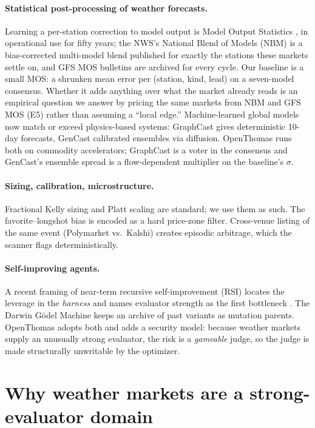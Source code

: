 \documentclass[sigconf,review,anonymous]{acmart}
\begin{document}
\paragraph{Statistical post-processing of weather forecasts.} Learning a
per-station correction to model output is Model Output Statistics
\cite{mos1972}, in operational use for fifty years; the NWS's National Blend
of Models (NBM) \cite{nbm} is a bias-corrected multi-model blend published for
exactly the stations these markets settle on, and GFS MOS bulletins are archived
for every cycle. Our baseline is a small MOS: a shrunken mean error per
(station, kind, lead) on a seven-model consensus. Whether it adds anything over
what the market already reads is an empirical question we answer by pricing the
same markets from NBM and GFS MOS (E5) rather than assuming a ``local edge.''
Machine-learned global models now match or exceed physics-based systems:
GraphCast \cite{graphcast} gives deterministic 10-day forecasts, GenCast
\cite{gencast} calibrated ensembles via diffusion. OpenThomas runs both on
commodity accelerators; GraphCast is a voter in the consensus and GenCast's
ensemble spread is a flow-dependent multiplier on the baseline's $\sigma$.

\paragraph{Sizing, calibration, microstructure.} Fractional Kelly sizing
\cite{kelly} and Platt scaling \cite{platt} are standard; we use them as such.
The favorite--longshot bias \cite{longshot} is encoded as a hard price-zone
filter. Cross-venue listing of the same event (Polymarket vs.\ Kalshi) creates
episodic arbitrage, which the scanner flags deterministically.

\paragraph{Self-improving agents.} A recent framing of near-term recursive
self-improvement (RSI) locates the leverage in the \emph{harness} and names
evaluator strength as the first bottleneck \cite{harness}. The Darwin G\"odel
Machine \cite{dgm} keeps an archive of past variants as mutation parents.
OpenThomas adopts both and adds a security model: because weather markets
supply an unusually strong evaluator, the risk is a \emph{gameable} judge, so
the judge is made structurally unwritable by the optimizer.

\section{Why weather markets are a strong-evaluator domain}
\label{sec:weather}
\end{document}
